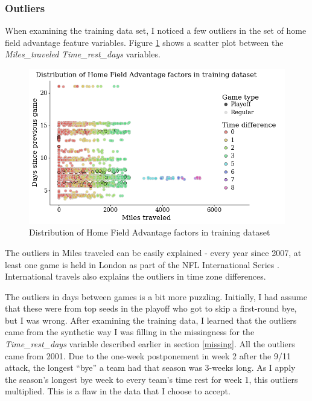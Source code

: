 \documentclass[12pt, letterpaper, twoside]{article}
\begin{document}
\subsubsection{Outliers}

When examining the training data set, I noticed a few outliers in the set of home field advantage feature variables. Figure \ref{fig:hfa} shows a scatter plot between  the \textit{Miles\_traveled} \textit{Time\_rest\_days} variables.
\begin{figure}[H]%
\centering
   \includegraphics[width=0.75\linewidth]{../09_figures/plot_hfa.png} 
    \caption{Distribution of Home Field Advantage factors in training dataset}
    \label{fig:hfa}%
\end{figure}

The outliers in Miles traveled can be easily explained - every year since 2007, at least one game is held in London as part of the NFL International Series \citep{int}. International travels also explains the outliers in time zone differences.

The outliers in days between games is a bit more puzzling. Initially, I had assume that these were from top seeds in the playoff who got to skip a first-round bye, but I was wrong. After examining the training data, I learned that the outliers came from the synthetic way I was filling in the missingness for the \textit{Time\_rest\_days} variable described earlier in section \ref{missing}. All the outliers came from 2001. Due to the one-week postponement in week 2 after the 9/11 attack, the longest ``bye'' a team had that season was 3-weeks long. As I apply the season's longest bye week to every team's time rest for week 1, this outliers multiplied. This is a flaw in the data that I choose to accept.
\end{document}
